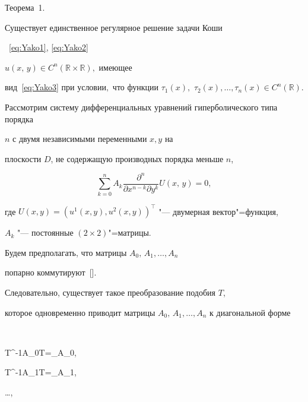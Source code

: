 \smallskip



{\small\sc Теорема~1.} {\it 

Существует единственное регулярное решение задачи Коши}~\eqref{eq:Yako1}, \eqref{eq:Yako2} {\it

 $u\left(x,\,y\right)\in C^{n}(\mathbb{R}\times\mathbb{R}),$  имеющее

вид~\eqref{eq:Yako3} при условии$,$ что функции $\tau_{1}(x),$ $\tau_{2}(x),\ldots,\tau_{n}(x) \in

C^{n}(\mathbb{R}).$

}



\smallskip




Рассмотрим систему дифференциальных уравнений гиперболического типа порядка

$n$ с двумя независимыми переменными $x, y$ на

плоскости $D$, не содержащую производных порядка меньше $n$,

\begin{equation}

\sum\limits_{k=0}^{n}A_{k}\dfrac{\partial^{n}}{\partial x^{n-k}\partial y^{k}}U(x,\,y)=0,\label{eq:Yako5}

\end{equation}

где $U(x,y)=(u^{1}(x,y),u^{2}(x,y))^{\top}$ "--- двумерная вектор"=функция, 

$A_{k}$ "--- постоянные $(2\times2)$"=матрицы.



Будем предполагать, что матрицы $A_{0},\,A_{1},\ldots, A_{n}$

попарно коммутируют~[].

Следовательно, существует такое преобразование подобия $T$,

которое одновременно приводит матрицы $A_{0},\,A_{1},\ldots,

A_{n}$ к диагональной форме

$$

T^{-1}A_{0}T=\Lambda_{A_{0}},\quad 

T^{-1}A_{1}T=\Lambda_{A_{1}},\quad 

\ldots,\quad 

